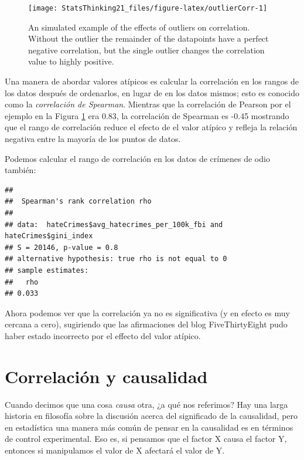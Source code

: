 \documentclass[
  12pt,
]{book}
\theoremstyle{definition}
\theoremstyle{definition}
\theoremstyle{definition}
\theoremstyle{remark}
\begin{document}
\begin{figure}
\texttt{[image: StatsThinking21\_files/figure-latex/outlierCorr-1]} \caption{An simulated example of the effects of outliers on correlation.  Without the outlier the remainder of the datapoints have a perfect negative correlation, but the single outlier changes the correlation value to highly positive.}\label{fig:outlierCorr}
\end{figure}

Una manera de abordar valores atípicos es calcular la correlación en los rangos de los datos después de ordenarlos, en lugar de en los datos mismos; esto es conocido como la \emph{correlación de Spearman}. Mientras que la correlación de Pearson por el ejemplo en la Figura \ref{fig:outlierCorr} era 0.83, la correlación de Spearman es -0.45 mostrando que el rango de correlación reduce el efecto de el valor atípico y refleja la relación negativa entre la mayoría de los puntos de datos.

Podemos calcular el rango de correlación en los datos de crímenes de odio también:

\begin{verbatim}
## 
## 	Spearman's rank correlation rho
## 
## data:  hateCrimes$avg_hatecrimes_per_100k_fbi and hateCrimes$gini_index
## S = 20146, p-value = 0.8
## alternative hypothesis: true rho is not equal to 0
## sample estimates:
##   rho 
## 0.033
\end{verbatim}

Ahora podemos ver que la correlación ya no es significativa (y en efecto es muy cercana a cero), sugiriendo que las afirmaciones del blog FiveThirtyEight pudo haber estado incorrecto por el effecto del valor atípico.

\hypertarget{correlaciuxf3n-y-causalidad}{%
\section{Correlación y causalidad}\label{correlaciuxf3n-y-causalidad}}

Cuando decimos que una cosa \emph{causa} otra, ¿a qué nos referimos? Hay una larga historia en filosofía sobre la discusión acerca del significado de la causalidad, pero en estadística una manera más común de pensar en la causalidad es en términos de control experimental. Eso es, si pensamos que el factor X causa el factor Y, entonces si manipulamos el valor de X afectará el valor de Y.
\end{document}
